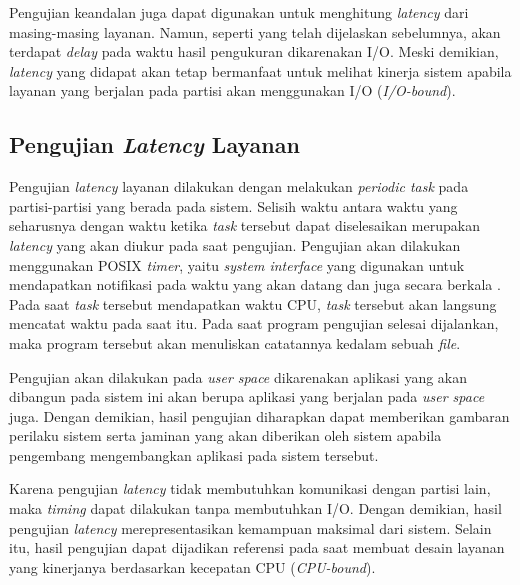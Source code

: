 Pengujian keandalan juga dapat digunakan untuk menghitung \textit{latency} dari masing-masing
layanan. Namun, seperti yang telah dijelaskan sebelumnya, akan terdapat \textit{delay} pada
waktu hasil pengukuran dikarenakan I/O. Meski demikian, \textit{latency} yang didapat akan tetap
bermanfaat untuk melihat kinerja sistem apabila layanan yang berjalan pada partisi akan
menggunakan I/O (\textit{I/O-bound}).

\subsection{Pengujian \textit{Latency} Layanan}
\label{section:pengujian_latency}

Pengujian \textit{latency} layanan dilakukan dengan melakukan \textit{periodic task} pada
partisi-partisi yang berada pada sistem. Selisih waktu antara waktu yang seharusnya dengan waktu
ketika \textit{task} tersebut dapat diselesaikan merupakan \textit{latency} yang akan diukur
pada saat pengujian. Pengujian akan dilakukan menggunakan POSIX \textit{timer}, yaitu
\textit{system interface} yang digunakan untuk mendapatkan notifikasi pada waktu yang akan
datang dan juga secara berkala \citep{POSIX}. Pada saat \textit{task} tersebut mendapatkan waktu
CPU, \textit{task} tersebut akan langsung mencatat waktu pada saat itu. Pada saat program
pengujian selesai dijalankan, maka program tersebut akan menuliskan catatannya kedalam sebuah
\textit{file}.

Pengujian akan dilakukan pada \textit{user space} dikarenakan aplikasi yang akan dibangun pada
sistem ini akan berupa aplikasi yang berjalan pada \textit{user space} juga. Dengan demikian,
hasil pengujian diharapkan dapat memberikan gambaran perilaku sistem serta jaminan yang akan
diberikan oleh sistem apabila pengembang mengembangkan aplikasi pada sistem tersebut.

Karena pengujian \textit{latency} tidak membutuhkan komunikasi dengan partisi lain, maka
\textit{timing} dapat dilakukan tanpa membutuhkan I/O. Dengan demikian, hasil pengujian
\textit{latency} merepresentasikan kemampuan maksimal dari sistem. Selain itu, hasil pengujian
dapat dijadikan referensi pada saat membuat desain layanan yang kinerjanya berdasarkan kecepatan
CPU (\textit{CPU-bound}).

